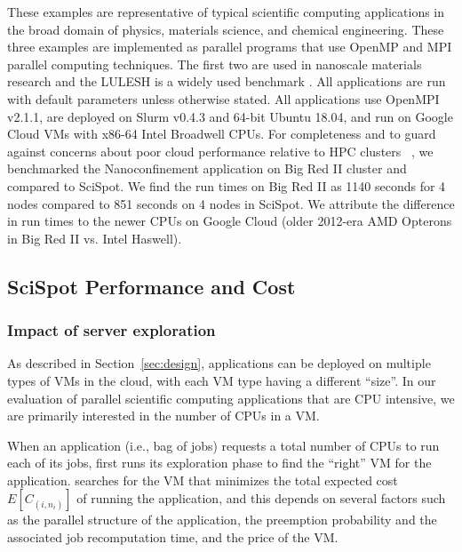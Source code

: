 These examples are representative of typical scientific computing applications in the broad domain of physics, materials science, and chemical engineering. These three examples are implemented as parallel programs that use OpenMP and MPI parallel computing techniques. The first two are used in nanoscale materials research \cite{jso1,jso2,solis2013generating,jjzo1,jto1,jyto} and the LULESH is a widely used benchmark \cite{IPDPS13:LULESH,LULESH2:changes}. All applications are run with default parameters unless otherwise stated. 
All applications use OpenMPI v2.1.1, are deployed on Slurm v0.4.3 and 64-bit Ubuntu 18.04, and run on Google Cloud VMs with x86-64 Intel Broadwell CPUs. 
For completeness and to guard against concerns about poor cloud performance relative to HPC clusters ~\cite{iosup_performance_2011, zhai_cloud_2011, marathe2013comparative, galante_analysis_2016, benedictis_cloud-aware_2014}, we benchmarked the Nanoconfinement application on Big Red II cluster and compared to SciSpot. We find the run times on Big Red II as 1140 seconds for 4 nodes compared to 851 seconds on 4 nodes in SciSpot. 
We attribute the difference in run times to the newer CPUs on Google Cloud (older 2012-era AMD Opterons in Big Red II vs. Intel Haswell).


\vspace*{\subsecspace}
\subsection{SciSpot Performance and Cost}

\subsubsection{Impact of server exploration}

As described in Section~\ref{sec:design}, applications can be deployed on multiple types of VMs in the cloud, with each VM type having a different ``size''.
In our evaluation of parallel scientific computing applications that are CPU intensive, we are primarily interested in the number of CPUs in a VM.

When an application (i.e., bag of jobs) requests a total number of CPUs to run each of its jobs, \sysname first runs its exploration phase to find the ``right'' VM for the application.
\sysname searches for the VM that minimizes the total expected cost $E[C_{(i,n_i)}]$ of running the application, and this depends on several factors such as the parallel structure of the application, the preemption probability and the associated job recomputation time, and the price of the VM.

